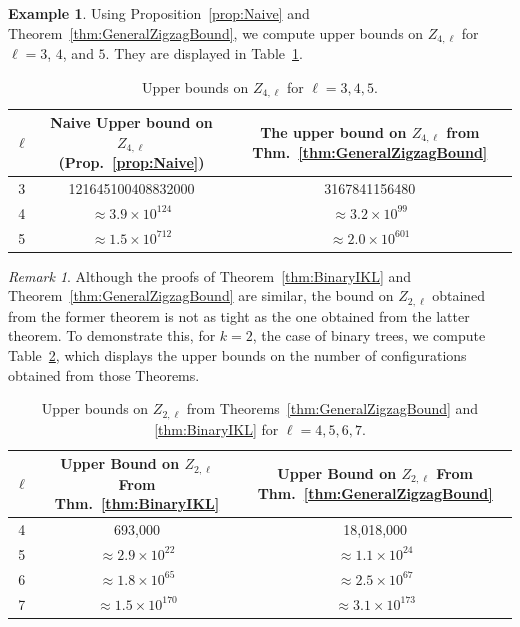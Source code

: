 \documentclass[11pt]{article}
\theoremstyle{remark}
\newtheorem*{remark*}{Remark}
\theoremstyle{definition}
\newtheorem{example}[theorem]{Example}
\begin{document}
\begin{example}
    Using Proposition~\ref{prop:Naive} and Theorem~\ref{thm:GeneralZigzagBound}, we compute upper bounds on $Z_{4, \ell}$ for $\ell = 3$, $4$, and $5$. They are displayed in Table~\ref{tab:Upperbdk4}.

    \begin{table}[H]
    \centering
    \begin{tabular}{|c|c|c|}
        \hline  $\ell$ & Naive Upper bound on $Z_{4, \ell}$ (Prop.~\ref{prop:Naive}) & The upper bound on $Z_{4, \ell}$ from Thm.~\ref{thm:GeneralZigzagBound} \\
         \hline 3 & 121645100408832000  & 3167841156480 \\ \hline 4 & $\approx 3.9\times 10^{124}$ & $ \approx 3.2  \times 10^{99}$  \\ \hline 5 & $\approx 1.5\times 10^{712}$ &  $\approx 2.0 \times 10^{601}$  \\ \hline
    \end{tabular}
    \caption{Upper bounds on $Z_{4, \ell}$ for $\ell=3, 4, 5$.}
    \label{tab:Upperbdk4}
\end{table}
\end{example}

\begin{remark*}
    Although the proofs of Theorem~\ref{thm:BinaryIKL} and Theorem~\ref{thm:GeneralZigzagBound} are similar, the bound on $Z_{2,\ell}$ obtained from the former theorem is not as tight as the one obtained from the latter theorem. To demonstrate this, for $k=2$, the case of binary trees, we compute Table~\ref{tab:ComparingBounds}, which displays the upper bounds on the number of configurations obtained from those Theorems.
    \begin{table}[H]
        \centering
        \begin{tabular}{|c|c|c|}\hline
             $\ell$  &  Upper Bound on $Z_{2, \ell}$ From Thm.~\ref{thm:BinaryIKL}& Upper Bound on $Z_{2, \ell}$ From Thm.~\ref{thm:GeneralZigzagBound} \\ \hline 4   & 693,000 & 18,018,000  \\ \hline 5
             & $\approx 2.9\times 10^{22}$  & $\approx 1.1\times10^{24}$ \\ \hline 6  & $\approx 1.8\times 10^{65}$ & $\approx 2.5 \times 10^{67}$ \\ \hline  7& $\approx 1.5 \times 10^{170}$   & $\approx 3.1 \times 10^{173}$  \\ \hline
        \end{tabular}
        \caption{Upper bounds on $Z_{2, \ell}$ from Theorems~\ref{thm:GeneralZigzagBound} and \ref{thm:BinaryIKL} for $\ell=4, 5, 6, 7$.}
        \label{tab:ComparingBounds}
    \end{table}
\end{remark*}
\end{document}
